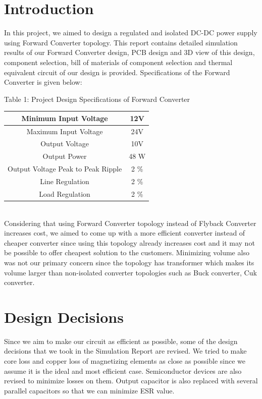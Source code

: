 \documentclass{article}
\newcommand\tab[1][1cm]{\hspace*{#1}}
\begin{document}
\section*{Introduction}
\tab In this project, we aimed to design a regulated and isolated DC-DC power supply using Forward Converter topology. This report contains detailed simulation results of our Forward Converter design, PCB design and 3D view of this design, component selection, bill of materials of component selection and thermal equivalent circuit of our design is provided. Specifications of the Forward Converter is given below:
\begin{center}
Table 1: Project Design Specifications of Forward Converter
\newline \\

 \begin{tabular}{||c c||} 
 \hline
 Minimum Input Voltage & 12V \\ 
 \hline
 Maximum Input Voltage & 24V  \\
 \hline
 Output Voltage & 10V  \\
 \hline
 Output Power & 48 W  \\
 \hline
 Output Voltage Peak to Peak Ripple & 2 \% \\
 \hline
  Line Regulation & 2 \% \\
 \hline
  Load Regulation & 2 \% \\
 \hline
 \end{tabular}
 \end{center} \\
 
 \tab Considering that using Forward Converter topology instead of Flyback Converter increases cost, we aimed to come up with a more efficient converter instead of cheaper converter since using this topology already increases cost and it may not be possible to offer cheapest solution to the customers. Minimizing volume also was not our primary concern since the topology has transformer which makes its volume larger than non-isolated converter topologies such as Buck converter, Cuk converter.
 
\newpage
\section*{Design Decisions}
\tab Since we aim to make our circuit as efficient as possible, some of the design decisions that we took in the Simulation Report are revised. We tried to make core loss and copper loss of magnetizing elements as close as possible since we assume it is the ideal and most efficient case. Semiconductor devices are also revised to minimize losses on them. Output capacitor is also replaced with several parallel capacitors so that we can minimize ESR value.
\end{document}
